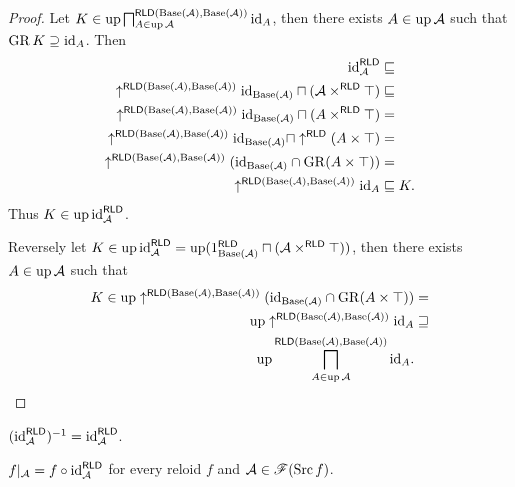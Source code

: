 \begin{proof}
Let $K\in\operatorname{up}\bigsqcap_{A\in\operatorname{up}\mathcal{A}}^{\mathsf{RLD}(\operatorname{Base}(\mathcal{A}),\operatorname{Base}(\mathcal{A}))}{\operatorname{id}}_{A}$,
then there exists $A\in\operatorname{up}\mathcal{A}$ such that $\operatorname{GR} K\supseteq{\operatorname{id}}_{A}$.
Then
\begin{align*}
{\operatorname{id}}_{\mathcal{A}}^{\mathsf{RLD}} & \sqsubseteq\\
\uparrow^{\mathsf{RLD}(\operatorname{Base}(\mathcal{A}),\operatorname{Base}(\mathcal{A}))}{\operatorname{id}}_{\operatorname{Base}(\mathcal{A})}\sqcap(\mathcal{A}\times^{\mathsf{RLD}}\top) & \sqsubseteq\\
\uparrow^{\mathsf{RLD}(\operatorname{Base}(\mathcal{A}),\operatorname{Base}(\mathcal{A}))}{\operatorname{id}}_{\operatorname{Base}(\mathcal{A})}\sqcap(A\times^{\mathsf{RLD}}\top) & =\\
\uparrow^{\mathsf{RLD}(\operatorname{Base}(\mathcal{A}),\operatorname{Base}(\mathcal{A}))}{\operatorname{id}}_{\operatorname{Base}(\mathcal{A})}\sqcap\uparrow^{\mathsf{RLD}}(A\times\top) & =\\
\uparrow^{\mathsf{RLD}(\operatorname{Base}(\mathcal{A}),\operatorname{Base}(\mathcal{A}))}({\operatorname{id}}_{\operatorname{Base}(\mathcal{A})}\cap\operatorname{GR}(A\times\top)) & =\\
\uparrow^{\mathsf{RLD}(\operatorname{Base}(\mathcal{A}),\operatorname{Base}(\mathcal{A}))}{\operatorname{id}}_{A} & \sqsubseteq K.
\end{align*}
Thus $K\in\operatorname{up}{\operatorname{id}}_{\mathcal{A}}^{\mathsf{RLD}}$.

Reversely let $K\in\operatorname{up}{\operatorname{id}}_{\mathcal{A}}^{\mathsf{RLD}}=\operatorname{up}(1_{\operatorname{Base}(\mathcal{A})}^{\mathsf{RLD}}\sqcap(\mathcal{A}\times^{\mathsf{RLD}}\top))$,
then there exists $A\in\operatorname{up}\mathcal{A}$ such that 
\begin{align*}
K\in\operatorname{up}\uparrow^{\mathsf{RLD}(\operatorname{Base}(\mathcal{A}),\operatorname{Base}(\mathcal{A}))}({\operatorname{id}}_{\operatorname{Base}(\mathcal{A})}\cap\operatorname{GR}(A\times\top)) & =\\
\operatorname{up}\uparrow^{\mathsf{RLD}(\operatorname{Base}(\mathcal{A}),\operatorname{Base}(\mathcal{A}))}{\operatorname{id}}_{A} & \sqsupseteq\\
\operatorname{up}\bigsqcap_{A\in\operatorname{up}\mathcal{A}}^{\mathsf{RLD}(\operatorname{Base}(\mathcal{A}),\operatorname{Base}(\mathcal{A}))}{\operatorname{id}}_{A}.
\end{align*}
\end{proof}
\begin{cor}
$({\operatorname{id}}_{\mathcal{A}}^{\mathsf{RLD}})^{-1}={\operatorname{id}}_{\mathcal{A}}^{\mathsf{RLD}}$.\end{cor}
\begin{thm}\label{thm-rld-restrict-composition}
$f|_{\mathcal{A}}=f\circ{\operatorname{id}}_{\mathcal{A}}^{\mathsf{RLD}}$ for every
reloid $f$ and $\mathcal{A}\in\mathscr{F}(\operatorname{Src} f)$.\end{thm}

